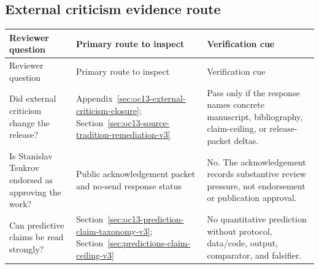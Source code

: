 \subsection{External criticism evidence route}
\label{sec:oc13-reviewer-navigation-external-criticism-v3}

\begin{longtable}{@{}p{}p{}p{}@{}}
\toprule
Reviewer question & Primary route to inspect & Verification cue \\
\midrule
\endfirsthead
\toprule
Reviewer question & Primary route to inspect & Verification cue \\
\midrule
\endhead
Did external criticism change the release? & Appendix~\ref{sec:oc13-external-criticism-closure}; Section~\ref{sec:oc13-source-tradition-remediation-v3} & Pass only if the response names concrete manuscript, bibliography, claim-ceiling, or release-packet deltas. \\
Is Stanislav Tsukrov endorsed as approving the work? & Public acknowledgement packet and no-send response status & No. The acknowledgement records substantive review pressure, not endorsement or publication approval. \\
Can predictive claims be read strongly? & Section~\ref{sec:oc13-prediction-claim-taxonomy-v3}; Section~\ref{sec:predictions-claim-ceiling-v3} & No quantitative prediction without protocol, data/code, output, comparator, and falsifier. \\
\bottomrule
\end{longtable}

\clearpage

